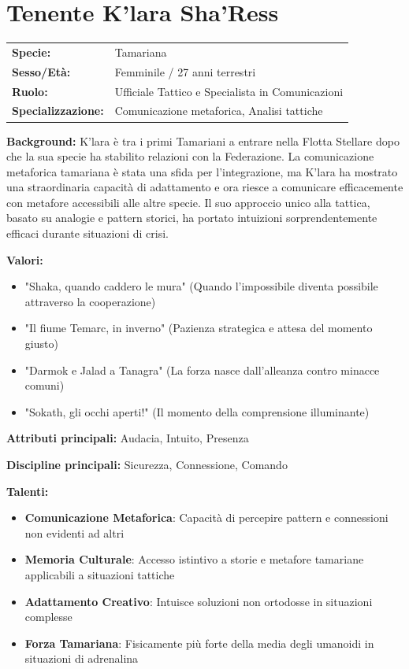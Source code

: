 \documentclass[11pt,a4paper]{article}
\begin{document}
\section{Tenente K'lara Sha'Ress}

\begin{tcolorbox}[colback=fedlightblue!10, colframe=fedblue]
\begin{tabularx}{\textwidth}{lX}
\textbf{Specie:} & Tamariana \\
\textbf{Sesso/Età:} & Femminile / 27 anni terrestri \\
\textbf{Ruolo:} & Ufficiale Tattico e Specialista in Comunicazioni \\
\textbf{Specializzazione:} & Comunicazione metaforica, Analisi tattiche \\
\end{tabularx}

\textbf{Background:} K'lara è tra i primi Tamariani a entrare nella Flotta Stellare dopo che la sua specie ha stabilito relazioni con la Federazione. La comunicazione metaforica tamariana è stata una sfida per l'integrazione, ma K'lara ha mostrato una straordinaria capacità di adattamento e ora riesce a comunicare efficacemente con metafore accessibili alle altre specie. Il suo approccio unico alla tattica, basato su analogie e pattern storici, ha portato intuizioni sorprendentemente efficaci durante situazioni di crisi.

\textbf{Valori:}
\begin{itemize}[leftmargin=*]
\item "Shaka, quando caddero le mura" (Quando l'impossibile diventa possibile attraverso la cooperazione)
\item "Il fiume Temarc, in inverno" (Pazienza strategica e attesa del momento giusto)
\item "Darmok e Jalad a Tanagra" (La forza nasce dall'alleanza contro minacce comuni)
\item "Sokath, gli occhi aperti!" (Il momento della comprensione illuminante)
\end{itemize}

\textbf{Attributi principali:} Audacia, Intuito, Presenza

\textbf{Discipline principali:} Sicurezza, Connessione, Comando

\textbf{Talenti:}
\begin{itemize}[leftmargin=*]
\item \textbf{Comunicazione Metaforica}: Capacità di percepire pattern e connessioni non evidenti ad altri
\item \textbf{Memoria Culturale}: Accesso istintivo a storie e metafore tamariane applicabili a situazioni tattiche
\item \textbf{Adattamento Creativo}: Intuisce soluzioni non ortodosse in situazioni complesse
\item \textbf{Forza Tamariana}: Fisicamente più forte della media degli umanoidi in situazioni di adrenalina
\end{itemize}
\end{tcolorbox}
\end{document}
